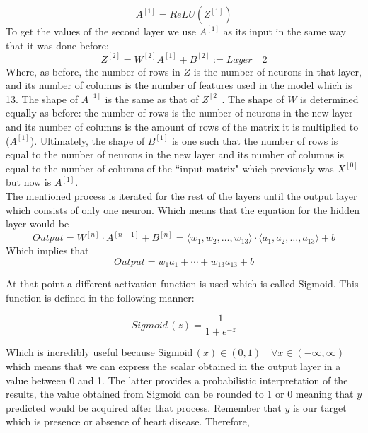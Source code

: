 \documentclass[12pt]{article}
\begin{document}
\begin{equation}
    A^{[1]} = ReLU(Z^{[1]})
\end{equation}
To get the values of the second layer we use $A^{[1]}$ as its input in the same way that it was done before:
\begin{equation}
    Z^{[2]} = W^{[2]}A^{[1]} + B^{[2]} := Layer \quad 2
\end{equation}
Where, as before, the number of rows in $Z$ is the number of neurons in that layer, and its number of columns is the number of features used in the model which is 13. The shape of $A^{[1]}$ is the same as that of $Z^{[2]}$.
The shape of $W$ is determined equally as before: the number of rows is the number of neurons in the new layer and its  number of columns is the amount of rows of the matrix it is multiplied to ($A^{[1]}$). Ultimately, the shape of $B^{[1]}$ is one such that the number of rows is equal to the number of neurons in the new layer and its number of columns is equal to the number of columns of the ``input matrix" which previously was $X^{[0]}$ but now is $A^{[1]}$.\\

The mentioned process is iterated for the rest of the layers until the output layer which consists of only one neuron. Which means that the equation for the hidden layer would be
\begin{equation}
    Output = W^{[n]} \cdot A^{[n-1]} + B^{[n]} = \langle w_{1}, w_{2}, \ldots , w_{13} \rangle \cdot \langle a_{1}, a_{2}, \ldots , a_{13} \rangle + b
\end{equation}
Which implies that
\begin{equation}
    Output = w_{1}a_{1} + \cdots + w_{13}a_{13} + b
\end{equation}

At that point a different activation function is used which is called Sigmoid. This function is defined in the following manner:

\[
Sigmoid\,(z) = \frac{1}{1+e^{-z}}
\]

Which is incredibly useful because Sigmoid$\,(x) \in (0,1) \quad \forall x \in (-\infty,\infty)$ which means that we can express the scalar obtained in the output layer in a value between 0 and 1. 
The latter provides a probabilistic interpretation of the results, the value obtained from Sigmoid can be rounded to 1 or 0 meaning that $y$ predicted would be acquired after that process. Remember that $y$ is our target which is presence or absence of heart disease.
Therefore,
\end{document}
